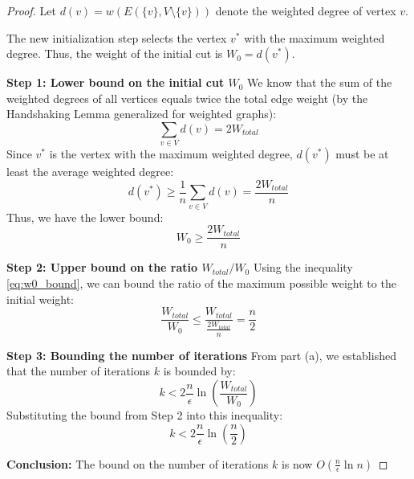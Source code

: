 \begin{proof}
Let $d(v) = w(E(\{v\}, V \setminus \{v\}))$ denote the weighted degree of vertex $v$.

The new initialization step selects the vertex $v^*$ with the maximum weighted degree. Thus, the weight of the initial cut is $W_0 = d(v^*)$.

\vspace{1em}
\noindent\textbf{Step 1: Lower bound on the initial cut $W_0$}
We know that the sum of the weighted degrees of all vertices equals twice the total edge weight (by the Handshaking Lemma generalized for weighted graphs):
\[
    \sum_{v \in V} d(v) = 2 W_{total}
\]
Since $v^*$ is the vertex with the maximum weighted degree, $d(v^*)$ must be at least the average weighted degree:
\[
    d(v^*) \ge \frac{1}{n} \sum_{v \in V} d(v) = \frac{2 W_{total}}{n}
\]
Thus, we have the lower bound:
\begin{equation} \label{eq:w0_bound}
    W_0 \ge \frac{2 W_{total}}{n}
\end{equation}

\vspace{1em}
\noindent\textbf{Step 2: Upper bound on the ratio $W_{total}/W_0$}
Using the inequality \eqref{eq:w0_bound}, we can bound the ratio of the maximum possible weight to the initial weight:
\[
    \frac{W_{total}}{W_0} \le \frac{W_{total}}{\frac{2 W_{total}}{n}} = \frac{n}{2}
\]

\vspace{1em}
\noindent\textbf{Step 3: Bounding the number of iterations}
From part (a), we established that the number of iterations $k$ is bounded by:
\[
    k < 2 \frac{n}{\epsilon} \ln\left(\frac{W_{total}}{W_0}\right)
\]
Substituting the bound from Step 2 into this inequality:
\[
    k < 2 \frac{n}{\epsilon} \ln\left(\frac{n}{2}\right)
\]

\vspace{1em}
\noindent\textbf{Conclusion:}
The bound on the number of iterations $k$ is now $O(\frac{n}{\epsilon} \ln n)$
\end{proof}